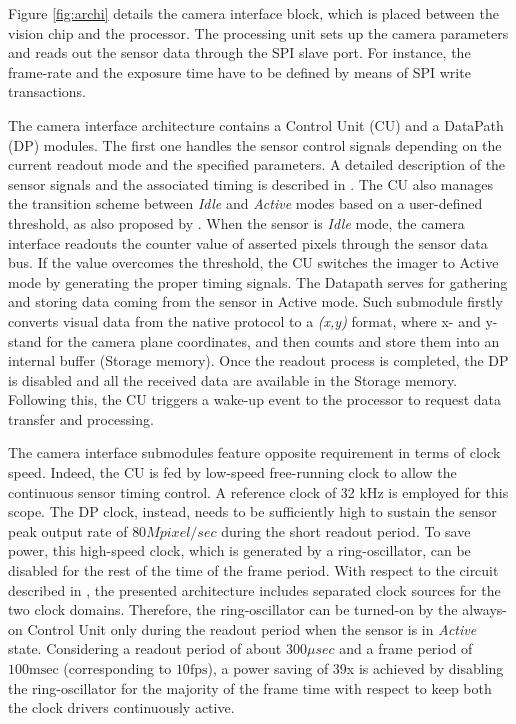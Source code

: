 \documentclass[journal]{IEEEtran}
\begin{document}

Figure \ref{fig:archi} details the camera interface block, which is placed between the vision chip and the processor.
The processing unit sets up the camera parameters and reads out the sensor data through the SPI slave port. For instance, the frame-rate and the exposure time have to be defined by means of SPI write transactions.%

The camera interface architecture contains a Control Unit (CU) and a DataPath (DP) modules. The first one handles the sensor control signals depending on the current readout mode and the specified parameters. A detailed description of the sensor signals and the associated timing is described in \cite{Gottardi2009}. The CU also manages the transition scheme between \textit{Idle} and \textit{Active} modes based on a user-defined threshold, as also proposed by \cite{Gasparini2011}. 
When the sensor is \textit{Idle} mode, the camera interface readouts the counter value of asserted pixels through the sensor data bus. If the value overcomes the threshold, the CU switches the imager to Active mode by generating the proper timing signals. 
The Datapath serves for gathering and storing data coming from the sensor in Active mode. Such submodule firstly converts visual data from the native protocol to a \textit{(x,y)} format, where x- and y- stand for the camera plane coordinates, and then counts and store them into an internal buffer (Storage memory). 
Once the readout process is completed, the DP is disabled and all the received data are available in the Storage memory. Following this, the CU triggers a wake-up event to the processor to request data transfer and processing. 


The camera interface submodules feature opposite requirement in terms of clock speed. Indeed, the CU is fed by low-speed free-running clock to allow the continuous sensor timing control. A reference clock of 32 kHz is employed for this scope. The DP clock, instead, needs to be sufficiently high to sustain the sensor peak output rate of $80Mpixel/sec$ during the short readout period. To save power, this high-speed clock, which is generated by a ring-oscillator, can be disabled for the rest of the time of the frame period. With respect to the circuit described in \cite{Gasparini2011}, the presented architecture includes separated clock sources for the two clock domains. Therefore, the ring-oscillator can be turned-on by the always-on Control Unit only during the readout period when the sensor is in \textit{Active} state. Considering a readout period of about $300\mu sec$ and a frame period of $\mathrm{100msec}$ (corresponding to $\mathrm{10fps}$), a power saving of 39x is achieved by disabling the ring-oscillator for the majority of the frame time with respect to keep both the clock drivers continuously active.
\end{document}

